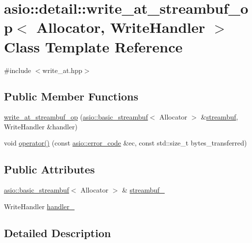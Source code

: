\hypertarget{classasio_1_1detail_1_1write__at__streambuf__op}{}\section{asio\+:\+:detail\+:\+:write\+\_\+at\+\_\+streambuf\+\_\+op$<$ Allocator, Write\+Handler $>$ Class Template Reference}
\label{classasio_1_1detail_1_1write__at__streambuf__op}


{\ttfamily \#include $<$write\+\_\+at.\+hpp$>$}

\subsection*{Public Member Functions}
\begin{DoxyCompactItemize}
\item 
\hyperlink{classasio_1_1detail_1_1write__at__streambuf__op_aacf12d7ef18e1bfeac6e8104557c3854}{write\+\_\+at\+\_\+streambuf\+\_\+op} (\hyperlink{classasio_1_1basic__streambuf}{asio\+::basic\+\_\+streambuf}$<$ Allocator $>$ \&\hyperlink{namespaceasio_a6a7ba348943527312eeace3492bf32ee}{streambuf}, Write\+Handler \&handler)
\item 
void \hyperlink{classasio_1_1detail_1_1write__at__streambuf__op_a0bac25acb1ea3a04fd710a7965c29f63}{operator()} (const \hyperlink{classasio_1_1error__code}{asio\+::error\+\_\+code} \&ec, const std\+::size\+\_\+t bytes\+\_\+transferred)
\end{DoxyCompactItemize}
\subsection*{Public Attributes}
\begin{DoxyCompactItemize}
\item 
\hyperlink{classasio_1_1basic__streambuf}{asio\+::basic\+\_\+streambuf}$<$ Allocator $>$ \& \hyperlink{classasio_1_1detail_1_1write__at__streambuf__op_a888b8cc4dc6b6b5ad8c6f08431807f59}{streambuf\+\_\+}
\item 
Write\+Handler \hyperlink{classasio_1_1detail_1_1write__at__streambuf__op_a3a22292265e05086dd362a791578be20}{handler\+\_\+}
\end{DoxyCompactItemize}


\subsection{Detailed Description}
